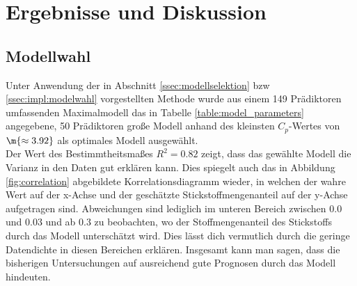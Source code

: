 \section{Ergebnisse und Diskussion}
\label{sec:discuss}

\subsection{Modellwahl}
\label{ssec:discuss:modelselect}
Unter Anwendung der in Abschnitt \ref{ssec:modellselektion} bzw \ref{ssec:impl:modelwahl} vorgestellten Methode wurde aus einem 149 Prädiktoren umfassenden Maximalmodell das in Tabelle \ref{table:model_parameters} angegebene, 50 Prädiktoren große Modell anhand des kleinsten $C_p$-Wertes von $\m{\approx3.92}$ als optimales Modell ausgewählt.\\

Der Wert des Bestimmtheitsmaßes $R^2 = 0.82$ zeigt, dass das gewählte Modell die Varianz in den Daten gut erklären kann. Dies spiegelt auch das in Abbildung \ref{fig:correlation} abgebildete Korrelationsdiagramm wieder, in welchen der wahre Wert auf der x-Achse und der geschätzte Stickstoffmengenanteil auf der y-Achse aufgetragen sind.
Abweichungen sind lediglich im unteren Bereich zwischen $0.0$ und $0.03$ und ab $0.3$ zu beobachten, wo der Stoffmengenanteil des Stickstoffs durch das Modell unterschätzt wird.
Dies lässt dich vermutlich durch die geringe Datendichte in diesen Bereichen erklären.
Insgesamt kann man sagen, dass die bisherigen Untersuchungen auf ausreichend gute Prognosen durch das Modell hindeuten.

